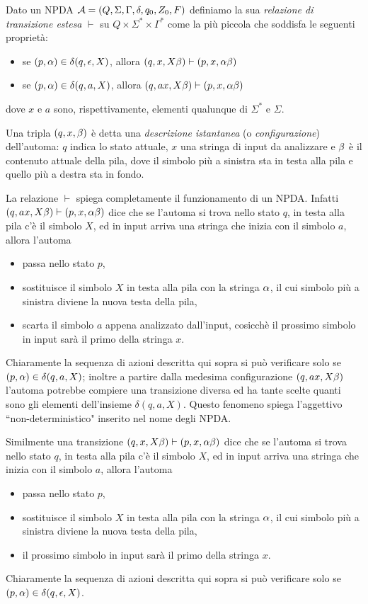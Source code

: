 \documentclass[runningheads,a4paper]{llncs}
\begin{document}
\begin{definition}\label{def:trans-est3}
Dato un NPDA $\mathcal{A} = (Q,\Sigma,\Gamma,\delta,q_0,Z_0,F)$ definiamo la sua \emph{relazione di transizione estesa} $\vdash$ su $Q \times \Sigma^* \times \Gamma^*$ come la pi\`{u} piccola che soddisfa le seguenti propriet\`{a}:
\begin{itemize}
\item se $(p,\alpha) \in \delta(q,\epsilon,X)$, allora $(q,x,X\beta) \vdash (p,x,\alpha\beta)$
\item se $(p,\alpha) \in \delta(q,a,X)$, allora $(q,ax,X\beta) \vdash (p,x,\alpha\beta)$
\end{itemize}
dove $x$ e $a$ sono, rispettivamente, elementi qualunque di $\Sigma^*$ e $\Sigma$.
\end{definition}

Una tripla $(q,x,\beta)$ \`{e} detta una \emph{descrizione istantanea} (o \emph{configurazione}) dell'automa: $q$ indica lo stato attuale, $x$ una stringa di input da analizzare e $\beta$ \`{e} il contenuto attuale della pila, dove il simbolo pi\`{u} a sinistra sta in testa alla pila e quello pi\`{u} a destra sta in fondo.

La relazione $\vdash$ spiega completamente il funzionamento di un NPDA. Infatti $(q,ax,X\beta) \vdash (p,x,\alpha\beta)$ dice che se l'automa si trova nello stato $q$, in testa alla pila c'\`{e} il simbolo $X$, ed in input arriva una stringa che inizia con il simbolo $a$, allora l'automa 
\begin{itemize}
\item passa nello stato $p$,
\item sostituisce il simbolo $X$ in testa alla pila con la stringa $\alpha$, il cui simbolo pi\`{u} a sinistra diviene la nuova testa della pila,
\item scarta il simbolo $a$ appena analizzato dall'input, cosicch\`{e} il prossimo simbolo in input sar\`{a} il primo della stringa $x$.
\end{itemize}
Chiaramente la sequenza di azioni descritta qui sopra si pu\`{o} verificare solo se $(p,\alpha) \in \delta(q,a,X)$; inoltre a partire dalla medesima configurazione $(q,ax,X\beta)$ l'automa potrebbe compiere una transizione diversa ed ha tante scelte quanti sono gli elementi dell'insieme $\delta(q,a,X)$. Questo fenomeno spiega l'aggettivo ``non-deterministico" inserito nel nome degli NPDA.

Similmente una transizione $(q,x,X\beta) \vdash (p,x,\alpha\beta)$ dice che se l'automa si trova nello stato $q$, in testa alla pila c'\`{e} il simbolo $X$, ed in input arriva una stringa che inizia con il simbolo $a$, allora l'automa 
\begin{itemize}
\item passa nello stato $p$,
\item sostituisce il simbolo $X$ in testa alla pila con la stringa $\alpha$, il cui simbolo pi\`{u} a sinistra diviene la nuova testa della pila,
\item il prossimo simbolo in input sar\`{a} il primo della stringa $x$.
\end{itemize}
Chiaramente la sequenza di azioni descritta qui sopra si pu\`{o} verificare solo se $(p,\alpha) \in \delta(q,\epsilon,X)$.
\end{document}
